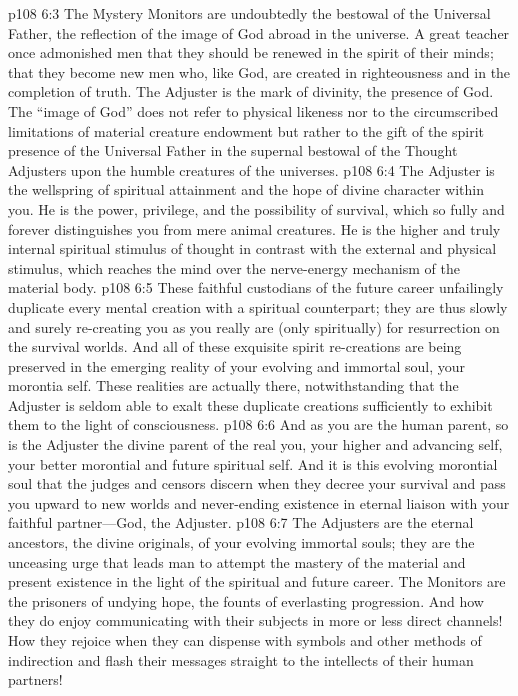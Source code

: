 \pc \vs p108 6:3 The Mystery Monitors are undoubtedly the bestowal of the Universal Father, the reflection of the image of God abroad in the universe. A great teacher once admonished men that they should be renewed in the spirit of their minds; that they become new men who, like God, are created in righteousness and in the completion of truth. The Adjuster is the mark of divinity, the presence of God. The “image of God” does not refer to physical likeness nor to the circumscribed limitations of material creature endowment but rather to the gift of the spirit presence of the Universal Father in the supernal bestowal of the Thought Adjusters upon the humble creatures of the universes.
\vs p108 6:4 The Adjuster is the wellspring of spiritual attainment and the hope of divine character within you. He is the power, privilege, and the possibility of survival, which so fully and forever distinguishes you from mere animal creatures. He is the higher and truly internal spiritual stimulus of thought in contrast with the external and physical stimulus, which reaches the mind over the nerve\hyp{}energy mechanism of the material body.
\vs p108 6:5 These faithful custodians of the future career unfailingly duplicate every mental creation with a spiritual counterpart; they are thus slowly and surely re\hyp{}creating you as you really are (only spiritually) for resurrection on the survival worlds. And all of these exquisite spirit re\hyp{}creations are being preserved in the emerging reality of your evolving and immortal soul, your morontia self. These realities are actually there, notwithstanding that the Adjuster is seldom able to exalt these duplicate creations sufficiently to exhibit them to the light of consciousness.
\pc \vs p108 6:6 And as you are the human parent, so is the Adjuster the divine parent of the real you, your higher and advancing self, your better morontial and future spiritual self. And it is this evolving morontial soul that the judges and censors discern when they decree your survival and pass you upward to new worlds and never\hyp{}ending existence in eternal liaison with your faithful partner---God, the Adjuster.
\vs p108 6:7 The Adjusters are the eternal ancestors, the divine originals, of your evolving immortal souls; they are the unceasing urge that leads man to attempt the mastery of the material and present existence in the light of the spiritual and future career. The Monitors are the prisoners of undying hope, the founts of everlasting progression. And how they do enjoy communicating with their subjects in more or less direct channels! How they rejoice when they can dispense with symbols and other methods of indirection and flash their messages straight to the intellects of their human partners!
